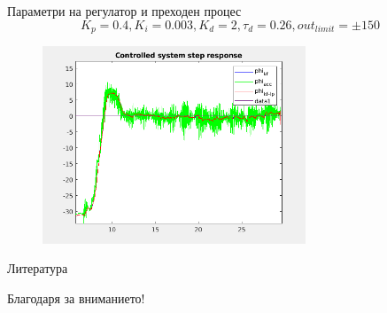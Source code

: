 \documentclass[handout]{beamer}
\begin{document}
\begin{frame}{Параметри на регулатор и преходен процес}
	\begin{equation*}
		K_p=0.4, K_i=0.003, K_d=2, \tau_d=0.26, out_{limit}=\pm150
	\end{equation*}
	\begin{figure}[htpb!]
		\centering
		\includegraphics[width=0.7\textwidth]{Images/controlled_system.png}
	\end{figure}
\end{frame}






\appendix

\begin{frame}{Литература}
	\nocite{*} %
	
	
\end{frame}


\begin{frame}[focus]
	Благодаря за вниманието!
\end{frame}


\end{document}
